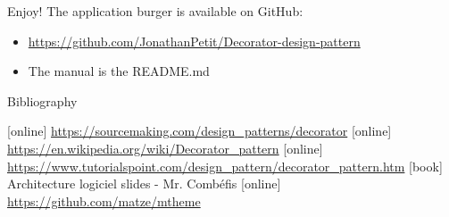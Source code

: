 \documentclass{beamer}
\begin{document}
  \appendix

  \begin{frame}{Enjoy!}
    The application burger is available on GitHub:
    \begin{itemize}
      \item \url{https://github.com/JonathanPetit/Decorator-design-pattern}
      \item The manual is the README.md
    \end{itemize}
  \end{frame}

  \begin{frame}[allowframebreaks]{Bibliography}
    \begin{thebibliography}{9}
      [online]
       \url{https://sourcemaking.com/design_patterns/decorator}
      [online]
       \url{https://en.wikipedia.org/wiki/Decorator_pattern}
      [online]
       \url{https://www.tutorialspoint.com/design_pattern/decorator_pattern.htm}
      [book]
       Architecture logiciel slides - Mr. Comb\'efis
      [online]
       \url{https://github.com/matze/mtheme}

    \end{thebibliography}
  \end{frame}
\end{document}
